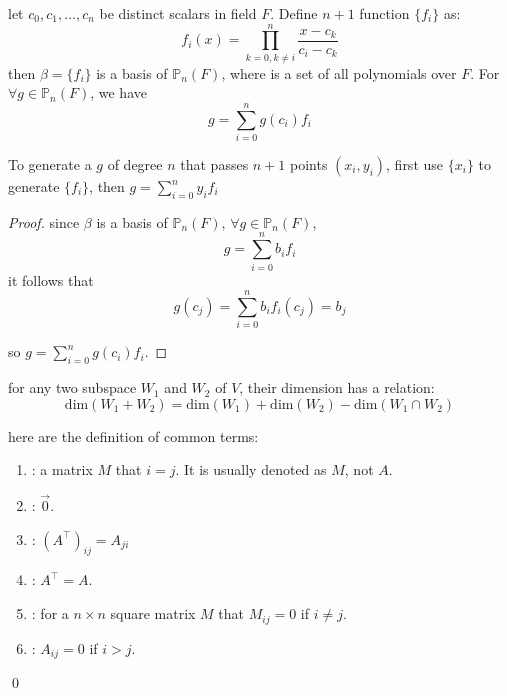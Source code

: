 \begin{definition}\label{lagrangeinterpolationformula}
let ${c_0, c_1, \dots, c_n}$ be distinct scalars in field $F$. Define  $n+1$ function $\{f_i \}$ as:
	\begin{equation}
	f_i(x) = \prod_{k=0, k \neq i}^n \frac{x - c_k}{c_i - c_k}
\end{equation}
then $\beta = \{f_i\}$ is a basis of $\mathbb{P}_n(F)$, where  is a set of all polynomials over $F$. For $\forall g \in \mathbb{P}_n(F)$, we have
	\begin{equation}
		g = \sum_{i=0}^n g(c_i) f_i
	\end{equation}
	
	To generate a $g$ of degree $n$ that passes $n+1$ points $(x_i, y_i)$, first use $\{x_i\}$ to generate $\{f_i \}$, then $g = \sum\limits_{i=0}^n y_i f_i $
\end{definition}


\begin{proof}
	since $\beta$ is a basis of $\mathbb{P}_n(F)$, $\forall g \in \mathbb{P}_n(F)$,
	\begin{equation*}
		g = \sum_{i=0}^n b_i f_i
	\end{equation*}
	it follows that
	\begin{equation*}
		g(c_j) = \sum_{i=0}^n b_i f_i(c_j) = b_j
	\end{equation*}

	so $g = \sum\limits_{i=0}^n g(c_i) f_i$.
\end{proof}


\begin{theorem}
for any two subspace $W_1$ and $W_2$ of $V$, their dimension has a relation:
\begin{equation}
	\text{dim}(W_1 + W_2) = \text{dim}(W_1) + \text{dim}(W_2) - \text{dim}(W_1 \cap W_2)
\end{equation}
\end{theorem}


\begin{definition}
    here are the definition of common terms:
    \begin{enumerate}
        \item {}: a matrix $M$ that $i = j$. It is usually denoted as $M$, not $A$.
        \item {}: $\vec{0}$.
        \item {}: $(A^\top)_{ij} = A_{ji}$
        \item {}: $A^\top = A$.
        \item {}: for a $n \times n$ square matrix $M$ that $M_{ij} = 0$ if $i \neq j$.
        \item {}: $A_{ij} = 0$ if $i > j$.
    \end{enumerate}
    \qed    
\end{definition}

